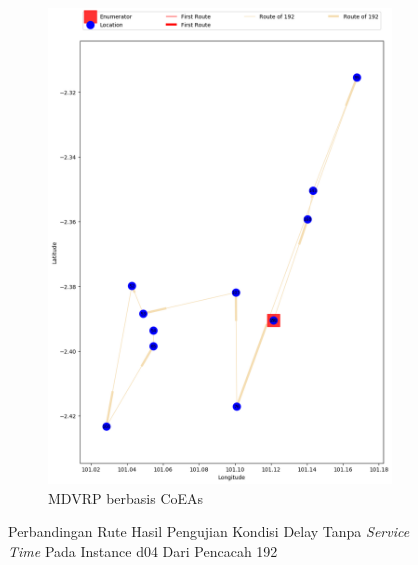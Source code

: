 \begin{figure}[H]
	\centering
	\begin{subfigure}[t]{\textwidth}
		\centering
		\includegraphics[width=\textwidth]{Resources/Images/delayed_5/real_m15_n100_delayed_5_192_coes}
		\caption{MDVRP berbasis CoEAs}
		\label{fig:real_m15_n100_delayed_5_192_coes}
	\end{subfigure}
	\caption{Perbandingan Rute Hasil Pengujian Kondisi Delay Tanpa \textit{Service Time} Pada Instance d04 Dari Pencacah 192}
	\label{fig:real_m15_n100_delayed_5_192}
\end{figure}


